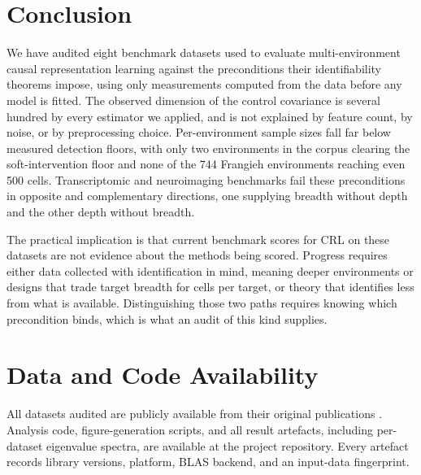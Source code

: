 \documentclass[journal,twoside,web]{ieeecolor}
\begin{document}
\section{Conclusion}
We have audited eight benchmark datasets used to evaluate multi-environment
causal representation learning against the preconditions their identifiability
theorems impose, using only measurements computed from the data before any
model is fitted. The observed dimension of the control covariance is several
hundred by every estimator we applied, and is not explained by feature count,
by noise, or by preprocessing choice. Per-environment sample sizes fall far
below measured detection floors, with only two environments in the corpus
clearing the soft-intervention floor and none of the 744 Frangieh environments
reaching even 500 cells. Transcriptomic and neuroimaging benchmarks fail these
preconditions in opposite and complementary directions, one supplying breadth
without depth and the other depth without breadth.

The practical implication is that current benchmark scores for CRL on these
datasets are not evidence about the methods being scored. Progress requires
either data collected with identification in mind, meaning deeper environments
or designs that trade target breadth for cells per target, or theory that
identifies less from what is available. Distinguishing those two paths
requires knowing which precondition binds, which is what an audit of this kind
supplies.

\section*{Data and Code Availability}
\label{sec:avail}
All datasets audited are publicly available from their original publications
\cite{replogle2022,norman2019,frangieh2021,vanessen2013,dimartino2014}.
Analysis code, figure-generation scripts, and all result artefacts, including
per-dataset eigenvalue spectra, are available at the project repository. Every
artefact records library versions, platform, BLAS backend, and an input-data
fingerprint.
\end{document}
